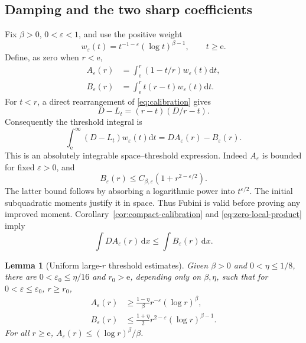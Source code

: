 \documentclass[11pt,a4paper]{article}
\numberwithin{equation}{section}
\newtheorem{lemma}[theorem]{Lemma}
\theoremstyle{definition}
\theoremstyle{remark}\newtheorem{remark}[theorem]{Remark}
\newcommand{\ee}{\mathrm e}
\newcommand{\dd}{\,\mathrm dx}
\begin{document}
\subsection{Damping and the two sharp coefficients}

Fix \(\beta>0\), \(0<\varepsilon<1\), and use the positive weight
\[
 w_\varepsilon(t)=t^{-1-\varepsilon}(\log t)^{\beta-1},
 \qquad t\geq\ee.
\]
Define, as zero when \(r<\ee\),
\begin{align}
 A_\varepsilon(r)&=\int_\ee^r(1-t/r)w_\varepsilon(t)\mathrm dt,
       \label{eq:A-damped}\\
 B_\varepsilon(r)&=\int_\ee^rt(r-t)w_\varepsilon(t)\mathrm dt.
       \label{eq:B-damped}
\end{align}
For \(t<r\), a direct rearrangement of \eqref{eq:calibration} gives
\[
 D-L_t=(r-t)(D/r-t).
\]
Consequently the threshold integral is
\begin{equation}\label{eq:damped-integral}
 \int_\ee^\infty(D-L_t)w_\varepsilon(t)\mathrm dt
       =D A_\varepsilon(r)-B_\varepsilon(r).
\end{equation}
This is an absolutely integrable space--threshold expression.
Indeed \(A_\varepsilon\) is bounded for fixed \(\varepsilon>0\), and
\[
 B_\varepsilon(r)\leq C_{\beta,\varepsilon}
                    (1+r^{2-\varepsilon/2}).
\]
The latter bound follows by absorbing a logarithmic power into
\(t^{\varepsilon/2}\). The initial subquadratic moments justify it
in space. Thus Fubini is valid before proving any improved moment.
Corollary~\ref{cor:compact-calibration} and
\eqref{eq:zero-local-product} imply
\begin{equation}\label{eq:integrated-damped}
 \int D A_\varepsilon(r)\dd\leq\int B_\varepsilon(r)\dd.
\end{equation}

\begin{lemma}[Uniform large-\(r\) threshold estimates]\label{lem:threshold}
Given \(\beta>0\) and \(0<\eta\leq1/8\), there are
\(0<\varepsilon_0\leq\eta/16\) and \(r_0> \ee\), depending only on
\(\beta,\eta\), such that for
\(0<\varepsilon\leq\varepsilon_0\), \(r\geq r_0\),
\begin{align}
 A_\varepsilon(r)&\geq
       \frac{1-\eta}{\beta}r^{-\varepsilon}(\log r)^\beta,
       \label{eq:A-leading}\\
 B_\varepsilon(r)&\leq
       \frac{1+\eta}{2}r^{2-\varepsilon}(\log r)^{\beta-1}.
       \label{eq:B-leading}
\end{align}
For all \(r\geq\ee\),
\(A_\varepsilon(r)\leq(\log r)^\beta/\beta\).
\end{lemma}
\end{document}
